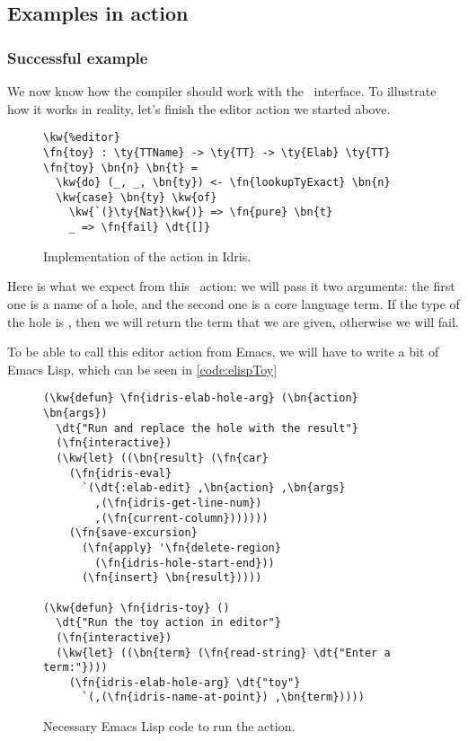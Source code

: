 \subsection{Examples in action}\label{sec:designExample}

\subsubsection{Successful example}

We now know how the compiler should work with the \Editorable\ interface.
To illustrate how it works in reality, let's finish the  editor action
we started above.

\begin{figure}[H]
\caption{Implementation of the  action in Idris.}
\begin{Verbatim}[framesep=2mm, label=\footnotesize{\normalfont{Idris}}, labelposition=topline]
\kw{%editor}
\fn{toy} : \ty{TTName} -> \ty{TT} -> \ty{Elab} \ty{TT}
\fn{toy} \bn{n} \bn{t} =
  \kw{do} (_, _, \bn{ty}) <- \fn{lookupTyExact} \bn{n}
  \kw{case} \bn{ty} \kw{of}
    \kw{`(}\ty{Nat}\kw{)} => \fn{pure} \bn{t}
    _ => \fn{fail} \dt{[]}
\end{Verbatim}
\end{figure}

Here is what we expect from this \Elab\ action: we will pass it two arguments:
the first one is a name of a hole, and the second one is a core language term.
If the type of the hole is , then we will return the term that we are
given, otherwise we will fail.

To be able to call this editor action from Emacs, we will have to write a bit
of Emacs Lisp, which can be seen in \autoref{code:elispToy}

\begin{figure}[ht]
\caption{Necessary Emacs Lisp code to run the  action.}
\label{code:elispToy}
\begin{Verbatim}[framesep=2mm, label=\footnotesize{\normalfont{Emacs Lisp}}, labelposition=topline]
(\kw{defun} \fn{idris-elab-hole-arg} (\bn{action} \bn{args})
  \dt{"Run and replace the hole with the result"}
  (\fn{interactive})
  (\kw{let} ((\bn{result} (\fn{car}
    (\fn{idris-eval}
      `(\dt{:elab-edit} ,\bn{action} ,\bn{args}
        ,(\fn{idris-get-line-num})
        ,(\fn{current-column}))))))
    (\fn{save-excursion}
      (\fn{apply} '\fn{delete-region}
        (\fn{idris-hole-start-end}))
      (\fn{insert} \bn{result}))))

(\kw{defun} \fn{idris-toy} ()
  \dt{"Run the toy action in editor"}
  (\fn{interactive})
  (\kw{let} ((\bn{term} (\fn{read-string} \dt{"Enter a term:"})))
    (\fn{idris-elab-hole-arg} \dt{"toy"}
      `(,(\fn{idris-name-at-point}) ,\bn{term}))))
\end{Verbatim}
\end{figure}

